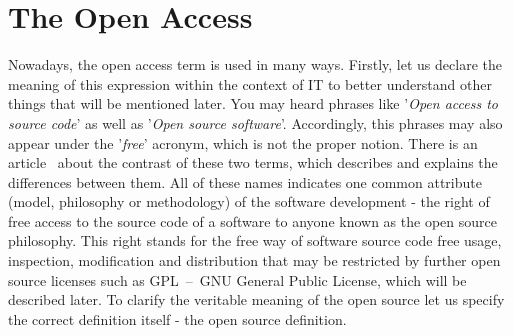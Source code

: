 \documentclass[12pt,a4paper]{article}
\theoremstyle{definition}
\begin{document}
\section{The Open Access}

    Nowadays, the open access term is used in many ways. Firstly, let us declare the meaning of this expression within the context of IT to better understand other things that will be mentioned later. You may heard phrases like '\textit{Open access to source code}' as well as '\textit{Open source software}'. Accordingly, this phrases may also appear under the '\textit{free}' acronym, which is not the proper notion. There is an article~\cite{WP:free-vs-open-source} about the contrast of these two terms, which describes and explains the differences between them. All of these names indicates one common attribute (model, philosophy or methodology) of the software development - the right of free access to the source code of a software to anyone known as the open source philosophy. This right stands for the free way of software source code free usage, inspection, modification and distribution that may be restricted by further open source licenses such as GPL~--~GNU General Public License, which will be described later. To clarify the veritable meaning of the open source let us specify the correct definition itself - the open source definition.\\[-3mm]
\end{document}
